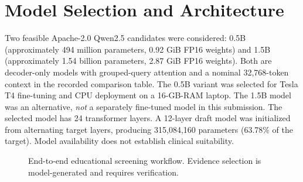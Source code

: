 \documentclass[conference]{IEEEtran}
\begin{document}
\section{Model Selection and Architecture}
Two feasible Apache-2.0 Qwen2.5 candidates were considered: 0.5B (approximately 494 million parameters, 0.92 GiB FP16 weights) and 1.5B (approximately 1.54 billion parameters, 2.87 GiB FP16 weights). Both are decoder-only models with grouped-query attention and a nominal 32,768-token context in the recorded comparison table. The 0.5B variant was selected for Tesla T4 fine-tuning and CPU deployment on a 16-GB-RAM laptop. The 1.5B model was an alternative, \emph{not} a separately fine-tuned model in this submission. The selected model has 24 transformer layers. A 12-layer draft model was initialized from alternating target layers, producing 315,084,160 parameters (63.78\% of the target). Model availability does not establish clinical suitability.
\begin{figure}[!t]\centering{}\caption{End-to-end educational screening workflow. Evidence selection is model-generated and requires verification.}\end{figure}
\end{document}
